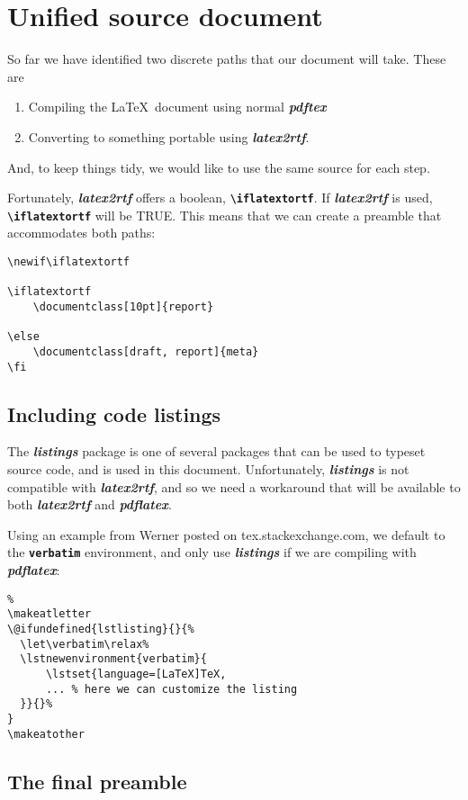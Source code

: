 \documentclass[12pt,letterpaper]{article}
\newcommand{\packagename}[1]{\textbf{\emph{#1}}}
\newcommand{\envname}[1]{\textbf{\texttt{#1}}}
\begin{document}
\section{Unified source document}
So far we have identified two discrete paths that our document will take. These are 
\begin{enumerate}
\item Compiling the \LaTeX\ document using normal \packagename{pdftex}
\item Converting to something portable using \packagename{latex2rtf}. 
\end{enumerate}
And, to keep things tidy, we would like to use the same source for each step. 

Fortunately, \packagename{latex2rtf} offers a boolean, \envname{\textbackslash iflatextortf}. If \packagename{latex2rtf} is used, \envname{\textbackslash iflatextortf} will be TRUE. This means that we can create a preamble that accommodates both paths:

\begin{verbatim}
\newif\iflatextortf

\iflatextortf
    \documentclass[10pt]{report}
    
\else
    \documentclass[draft, report]{meta} 
\fi
\end{verbatim}

\subsection{Including code listings}
The \packagename{listings} package is one of several packages that can be used to typeset source code, and is used in this document. Unfortunately, \packagename{listings} is not compatible with \packagename{latex2rtf}, and so we need a workaround that will be available to both \packagename{latex2rtf} and \packagename{pdflatex}. 

Using an example from Werner posted on tex.stackexchange.com, we default to the \envname{verbatim} environment, and only use \packagename{listings} if we are compiling with \packagename{pdflatex}:

\begin{verbatim}%
\makeatletter
\@ifundefined{lstlisting}{}{%
  \let\verbatim\relax%
  \lstnewenvironment{verbatim}{
      \lstset{language=[LaTeX]TeX,
      ... % here we can customize the listing
  }}{}%
}
\makeatother
\end{verbatim}

\subsection{The final preamble}
\end{document}
